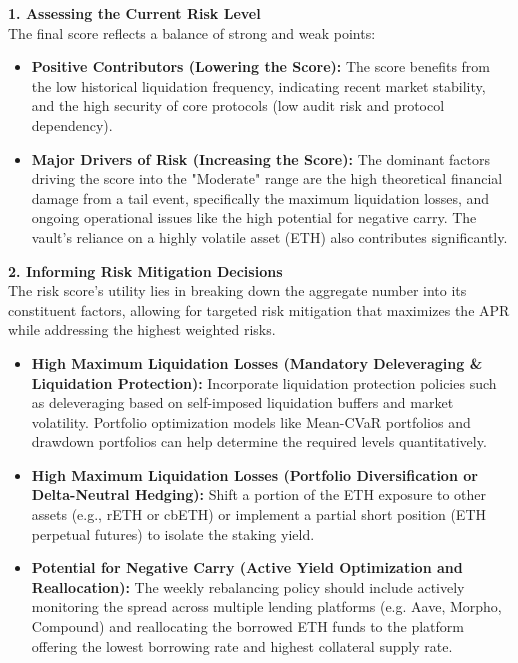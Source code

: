 \documentclass[11pt, a4paper]{article}
\begin{document}
\textbf{1. Assessing the Current Risk Level} \\
The final score reflects a balance of strong and weak points:
\begin{itemize}
    \item \textbf{Positive Contributors (Lowering the Score):} The score benefits from the low historical liquidation frequency, indicating recent market stability, and the high security of core protocols (low audit risk and protocol dependency).
    \item \textbf{Major Drivers of Risk (Increasing the Score):} The dominant factors driving the score into the "Moderate" range are the high theoretical financial damage from a tail event, specifically the maximum liquidation losses, and ongoing operational issues like the high potential for negative carry. The vault's reliance on a highly volatile asset (ETH) also contributes significantly.
\end{itemize}

\textbf{2. Informing Risk Mitigation Decisions} \\
The risk score's utility lies in breaking down the aggregate number into its constituent factors, allowing for targeted risk mitigation that maximizes the APR while addressing the highest weighted risks.

\begin{itemize}
    \item \textbf{High Maximum Liquidation Losses (Mandatory Deleveraging \& Liquidation Protection):} Incorporate liquidation protection policies such as deleveraging based on self-imposed liquidation buffers and market volatility. Portfolio optimization models like Mean-CVaR portfolios and drawdown portfolios can help determine the required levels quantitatively.
    
    \item \textbf{High Maximum Liquidation Losses (Portfolio Diversification or Delta-Neutral Hedging):} Shift a portion of the ETH exposure to other assets (e.g., rETH or cbETH) or implement a partial short position (ETH perpetual futures) to isolate the staking yield.
    
    \item \textbf{Potential for Negative Carry (Active Yield Optimization and Reallocation):} The weekly rebalancing policy should include actively monitoring the spread across multiple lending platforms (e.g. Aave, Morpho, Compound) and reallocating the borrowed ETH funds to the platform offering the lowest borrowing rate and highest collateral supply rate.
\end{itemize}
\end{document}
